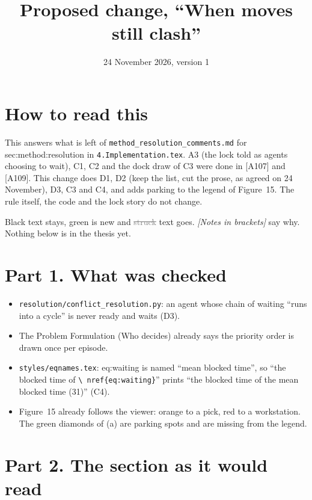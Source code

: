 \documentclass[11pt,a4paper]{article}
\title{Proposed change, ``When moves still clash''}
\date{24 November 2026, version 1}
\newcommand{\new}[1]{\textcolor{newc}{#1}}
\newcommand{\old}[1]{\textcolor{gray}{\sout{#1}}}
\newcommand{\note}[1]{{\small\itshape [#1]}}
\newcommand{\lab}[1]{\textsf{\footnotesize #1}}
\begin{document}
\sloppy
\maketitle

\section*{How to read this}
This answers what is left of \texttt{method\_resolution\_comments.md} for
\lab{sec:method:resolution} in \texttt{4.Implementation.tex}. A3 (the lock
told as agents choosing to wait), C1, C2 and the dock draw of C3 were done in
[A107] and [A109]. This change does D1, D2 (keep the list, cut the prose, as
agreed on 24 November), D3, C3 and C4, and adds parking to the legend of
Figure~15. The rule itself, the code and the lock story do not change.

Black text stays, \new{green} is new and \old{struck} text goes.
\note{Notes in brackets} say why. Nothing below is in the thesis yet.

\section*{Part 1. What was checked}
\begin{itemize}[nosep]
  \item \texttt{resolution/conflict\_resolution.py}: an agent whose chain of
    waiting ``runs into a cycle'' is never ready and waits (D3).
  \item The Problem Formulation (Who decides) already says the priority
    order is drawn once per episode.
  \item \texttt{styles/eqnames.tex}: \lab{eq:waiting} is named ``mean
    blocked time'', so ``the blocked time of \texttt{\textbackslash
    nref\{eq:waiting\}}'' prints ``the blocked time of the mean blocked time
    (31)'' (C4).
  \item Figure~15 already follows the viewer: orange to a pick, red to a
    workstation. The green diamonds of (a) are parking spots and are missing
    from the legend.
\end{itemize}

\section*{Part 2. The section as it would read}
\end{document}
